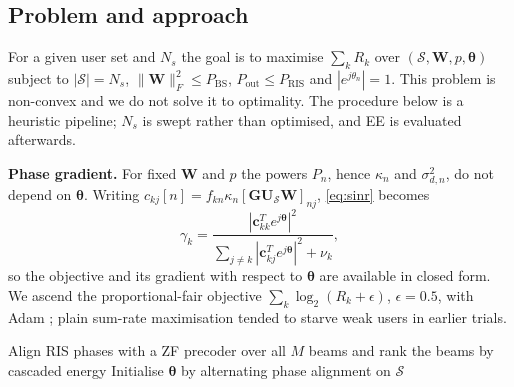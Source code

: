 \documentclass{ieeeaccess}
\begin{document}
\subsection{Problem and approach}
For a given user set and $N_s$ the goal is to maximise $\sum_kR_k$ over $(\mathcal S,\mathbf W,p,\boldsymbol\theta)$ subject to $|\mathcal S|=N_s$, $\|\mathbf W\|_F^2\le P_\mathrm{BS}$, $P_\mathrm{out}\le P_\mathrm{RIS}$ and $|e^{j\theta_n}|=1$. This problem is non-convex and we do not solve it to optimality. The procedure below is a heuristic pipeline; $N_s$ is swept rather than optimised, and EE is evaluated afterwards.

\textbf{Phase gradient.} For fixed $\mathbf W$ and $p$ the powers $P_n$, hence $\kappa_n$ and $\sigma_{d,n}^2$, do not depend on $\boldsymbol\theta$. Writing $c_{kj}[n]=f_{kn}\kappa_n[\mathbf G\mathbf U_{\mathcal S}\mathbf W]_{nj}$, \eqref{eq:sinr} becomes
\begin{equation}
\gamma_k=\frac{|\mathbf c_{kk}^T e^{j\boldsymbol\theta}|^2}{\sum_{j\ne k}|\mathbf c_{kj}^Te^{j\boldsymbol\theta}|^2+\nu_k},
\end{equation}
so the objective and its gradient with respect to $\boldsymbol\theta$ are available in closed form. We ascend the proportional-fair objective $\sum_k\log_2(R_k+\epsilon)$, $\epsilon=0.5$, with Adam \cite{kingma2015}; plain sum-rate maximisation tended to starve weak users in earlier trials.

\begin{algorithm}[t]\caption{Design for one user group (one time slot)}\label{alg:design}\small
{}
Align RIS phases with a ZF precoder over all $M$ beams and rank the beams by cascaded energy\;
Initialise $\boldsymbol\theta$ by alternating phase alignment on $\mathcal S$\;
\end{algorithm}
\end{document}
